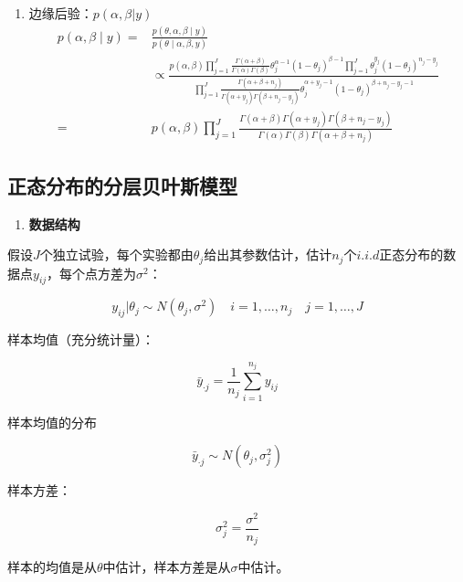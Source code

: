 \begin{enumerate}
\item
  边缘后验：\(p(\alpha,\beta|y)\)
\begin{equation}
  \begin{aligned}
    p(\alpha, \beta \mid y)
    =& \frac{p(\theta, \alpha, \beta \mid y)}{p(\theta \mid \alpha, \beta, y)} \\
    &\propto \frac{p(\alpha, \beta) \prod_{j=1}^{J} 
    \frac{\Gamma(\alpha+\beta)}{\Gamma(\alpha) \Gamma(\beta)} 
    \theta_{j}^{\alpha-1}\left(1-\theta_{j}\right)^{\beta-1} \prod_{j=1}^{J} \theta_{j}^{y_{j}}\left(1-\theta_{j}\right)^{n_{j}-y_{j}}}{\prod_{j=1}^{J} 
    \frac{\Gamma\left(\alpha+\beta+n_{j}\right)}{\Gamma\left(\alpha+y_{j}\right) \Gamma\left(\beta+n_{j}-y_{j}\right)} 
    \theta_{j}^{\alpha+y_{j}-1}\left(1-\theta_{j}\right)^{\beta+n_{j}-y_{j}-1}} \\
    =& p(\alpha, \beta) \prod_{j=1}^{J} \frac{\Gamma(\alpha+\beta) \Gamma\left(\alpha+y_{j}\right) 
    \Gamma\left(\beta+n_{j}-y_{j}\right)}{\Gamma(\alpha) \Gamma(\beta) \Gamma\left(\alpha+\beta+n_{j}\right)}
    \end{aligned}
\end{equation}

\end{enumerate}


\subsection{正态分布的分层贝叶斯模型}

\begin{enumerate}
\def\labelenumi{\arabic{enumi}.}
\item
  \textbf{数据结构}
\end{enumerate}

假设\(J\)个独立试验，每个实验都由\(\theta_j\)给出其参数估计，估计\(n_j\)个\(i.i.d\)正态分布的数据点\(y_{ij}\)，每个点方差为\(\sigma^2\)：

\[y_{i j} | \theta_{j} \sim N\left(\theta_{j}, \sigma^{2}\right) \quad i=1, \ldots, n_{j} \quad j=1, \ldots, J\]

样本均值（充分统计量）：

\[\bar{y}_{\cdot j}=\frac{1}{n_j}\sum_{i=1}^{n_j}y_{ij}\]

样本均值的分布

\[\bar y_{\cdot j} \sim N(\theta_j,\sigma^2_j)\]

样本方差：

\[\sigma^2_j=\frac{\sigma^2}{n_j}\]

样本的均值是从\(\theta\)中估计，样本方差是从\(\sigma\)中估计。

